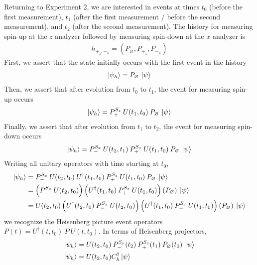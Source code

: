 Returning to Experiment 2, we are interested in events at times $t_0$ (before the first measurement), $t_1$ (after the first measurement / before the second measurement), and $t_2$ (after the sceond measurement). The history for measuring spin-up at the $z$ analyzer followed by measuring spin-down at the $x$ analyzer is
\begin{align}
  h_{+_z, -_x} = \left( P_\varnothing, P_{+_z} ,P_{-_x} \right)
\end{align}
%
First, we assert that the state initially occurs with the first event in the history
\begin{align}
  \ket{\psi_h} = P_\varnothing \: \ket{\psi}
\end{align}
Then, we assert that after evolution from $t_0$ to $t_1$, the event for measuring spin-up occurs
\begin{align}
  \ket{\psi_h} = P^{S_z}_+ \: U(t_1, t_0) \: P_\varnothing \: \ket{\psi}
\end{align}
Finally, we assert that after evolution from $t_1$ to $t_2$, the event for measuring spin-down occurs
\begin{align}
  \ket{\psi_h} = P^{S_x}_- \: U(t_2, t_1) \: P^{S_z}_+ \: U(t_1, t_0) \: P_\varnothing \: \ket{\psi}
\end{align}
Writing all unitary operators with time starting at $t_0$,
\begin{align}
  \ket{\psi_h} &= P^{S_x}_- \: U(t_2, t_0) \: U^\dagger(t_1, t_0) \: P^{S_z}_+ \: U(t_1, t_0) \: P_\varnothing \: \ket{\psi} \\ \nonumber
  &= \left(P^{S_x}_- \: U(t_2, t_0) \right) \left( U^\dagger(t_1, t_0) \: P^{S_z}_+ \: U(t_1, t_0) \right) \left( P_\varnothing \right) \: \ket{\psi} \\ \nonumber
  &= U(t_2, t_0)\left(U^\dagger(t_2, t_0) \: P^{S_x}_- \: U(t_2, t_0) \right) \left( U^\dagger(t_1, t_0) \: P^{S_z}_+ \: U(t_1, t_0) \right) \left( P_\varnothing \right) \: \ket{\psi}
\end{align}
we recognize the Heisenberg picture event operators ${P}(t) = U^\dagger(t, t_0) \: P \: U(t, t_0)$. In terms of Heisenberg projectors,
\begin{align}
  \ket{\psi_h} &= U(t_2, t_0) \: {P^{S_x}_-(t_2)} \: {P^{S_z}_+(t_1)} \: {P_\varnothing(t_0)} \: \ket{\psi} \\ \nonumber
  \ket{\psi_h} &= U(t_2, t_0) C_h^\dagger \ket{\psi}
\end{align}

